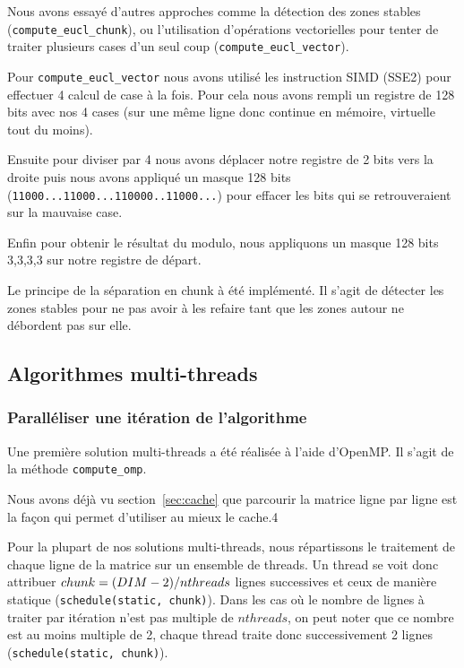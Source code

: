 Nous avons essayé d'autres approches comme la détection des zones
stables (\texttt{compute\_\-eucl\_\-chunk}), ou l'utilisation
d'opérations vectorielles pour tenter de traiter plusieurs cases d'un
seul coup (\texttt{compute\_\-eucl\_\-vector}).
\medskip

Pour \texttt{compute\_\-eucl\_\-vector} nous avons utilisé les
instruction SIMD (SSE2) pour effectuer 4 calcul de case à la
fois. Pour cela nous avons rempli un registre de 128 bits avec nos 4
cases (sur une même ligne donc continue en mémoire, virtuelle tout du
moins).

Ensuite pour diviser par 4 nous avons déplacer notre registre de 2
bits vers la droite puis nous avons appliqué un masque 128 bits
(\texttt{11000...11000...110000..11000...}) pour effacer les bits qui
se retrouveraient sur la mauvaise case.

Enfin pour obtenir le résultat du modulo, nous appliquons un masque
128 bits {3,3,3,3} sur notre registre de départ.
\medskip

Le principe de la séparation en chunk à été implémenté. Il s'agit
de détecter les zones stables pour ne pas avoir à les refaire tant
que les zones autour ne débordent pas sur elle.

\subsection{Algorithmes multi-threads}

\subsubsection{Paralléliser une itération de l'algorithme}

Une première solution multi-threads a été réalisée à l'aide
d'OpenMP. Il s'agit de la méthode \texttt{compute\_omp}.
\medskip

Nous avons déjà vu section~\ref{sec:cache} que parcourir la matrice
ligne par ligne est la façon qui permet d'utiliser au mieux le cache.4

Pour la plupart de nos solutions multi-threads, nous répartissons le
traitement de chaque ligne de la matrice sur un ensemble de
threads. Un thread se voit donc attribuer $chunk=\-(DIM-2)/nthreads$
lignes successives et ceux de manière statique
(\texttt{schedule(static, \-chunk)}). Dans les cas où le nombre de
lignes à traiter par itération n'est pas multiple de $nthreads$, on
peut noter que ce nombre est au moins multiple de 2, chaque thread
traite donc successivement 2 lignes (\texttt{schedule(static,
  \-chunk)}).

